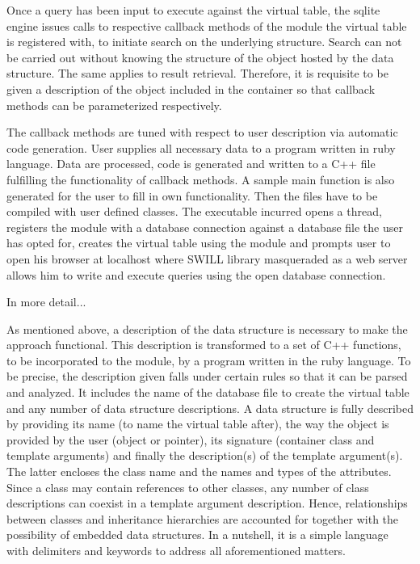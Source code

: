 \documentclass[pdftex, 11pt, a4paper]{report}
\begin{document}
\par
Once a query has been input to execute against the virtual table, the sqlite engine issues calls to respective callback methods of the module the virtual table is registered with, to initiate search on the underlying structure. Search can not be carried out without knowing the structure of the object hosted by the data structure. The same applies to result retrieval. Therefore, it is requisite to be given a description of the object included in the container so that callback methods can be parameterized respectively. 
\par
The callback methods are tuned with respect to user description via automatic code generation. User supplies all necessary data to a program written in ruby language. Data are processed, code is generated and written to a C++ file fulfilling the functionality of callback methods. A sample main function is also generated for the user to fill in own functionality. Then the files have to be compiled with user defined classes. The executable incurred opens a thread, registers the module with a database connection against a database file the user has opted for, creates the virtual table using the module and prompts user to open his browser at localhost where SWILL library masqueraded as a web server allows him to write and execute queries using the open database connection.
\par
In more detail...
\par
As mentioned above, a description of the data structure is necessary to make the approach functional. This description is transformed to a set of C++ functions, to be incorporated to the module, by a program written in the ruby language. To be precise, the description given falls under certain rules so that it can be parsed and analyzed. It includes the name of the database file to create the virtual table and any number of data structure descriptions. A data structure is fully described by providing its name (to name the virtual table after), the way the object is provided by the user (object or pointer), its signature (container class and template arguments) and finally the description(s) of the template argument(s). The latter encloses the class name and the names and types of the attributes. Since a class may contain references to other classes, any number of class descriptions can coexist in a template argument description. Hence, relationships between classes and inheritance hierarchies are accounted for together with the possibility of embedded data structures. In a nutshell, it is a simple language with delimiters and keywords to address all aforementioned matters.
\end{document}
